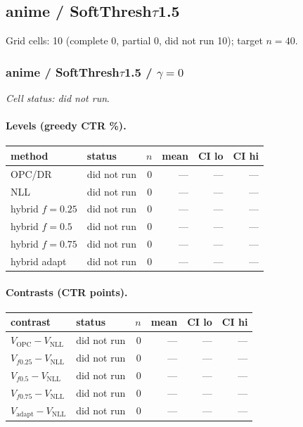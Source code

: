 \documentclass[10pt,a4paper]{article}
\begin{document}
\subsection{anime / SoftThresh$\tau$1.5}
Grid cells: 10 (complete 0, partial 0, did not run 10); target $n=40$.
\subsubsection{anime / SoftThresh$\tau$1.5 / $\gamma=0$}
\emph{Cell status: did not run}.
\paragraph{Levels (greedy CTR \%).}
{\centering\small\begin{tabular}{llrrrr}
\toprule method & status & $n$ & mean & CI lo & CI hi \\
\midrule
OPC/DR & did not run & 0 & --- & --- & --- \\
NLL & did not run & 0 & --- & --- & --- \\
hybrid $f{=}0.25$ & did not run & 0 & --- & --- & --- \\
hybrid $f{=}0.5$ & did not run & 0 & --- & --- & --- \\
hybrid $f{=}0.75$ & did not run & 0 & --- & --- & --- \\
hybrid adapt & did not run & 0 & --- & --- & --- \\
\bottomrule\end{tabular}\par}
\paragraph{Contrasts (CTR points).}
{\centering\small\begin{tabular}{llrrrr}
\toprule contrast & status & $n$ & mean & CI lo & CI hi \\
\midrule
$V_{\mathrm{OPC}}-V_{\mathrm{NLL}}$ & did not run & 0 & --- & --- & --- \\
$V_{f0.25}-V_{\mathrm{NLL}}$ & did not run & 0 & --- & --- & --- \\
$V_{f0.5}-V_{\mathrm{NLL}}$ & did not run & 0 & --- & --- & --- \\
$V_{f0.75}-V_{\mathrm{NLL}}$ & did not run & 0 & --- & --- & --- \\
$V_{\mathrm{adapt}}-V_{\mathrm{NLL}}$ & did not run & 0 & --- & --- & --- \\
\bottomrule\end{tabular}\par}
\bigskip
\end{document}
